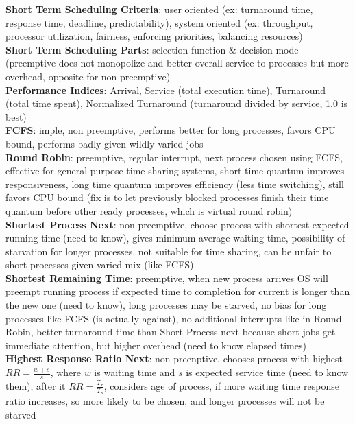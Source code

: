 \documentclass[a4paper]{article}
\begin{document}
\begin{multicols}{2}
        \textbf{Short Term Scheduling Criteria}: user oriented (ex: turnaround time, response time, deadline, predictability), system oriented (ex: throughput, processor utilization, fairness, enforcing priorities, balancing resources)\\
        \textbf{Short Term Scheduling Parts}: selection function \& decision mode (preemptive does not monopolize and better overall service to processes but more overhead, opposite for non preemptive)\\
        \textbf{Performance Indices}: Arrival, Service (total execution time), Turnaround (total time spent), Normalized Turnaround (turnaround divided by service, 1.0 is best)\\
        \textbf{FCFS}: imple, non preemptive, performs better for long processes, favors CPU bound, performs badly given wildly varied jobs\\
        \textbf{Round Robin}: preemptive, regular interrupt, next process chosen using FCFS, effective for general purpose time sharing systems, short time quantum improves responsiveness, long time quantum improves efficiency (less time switching), still favors CPU bound (fix is to let previously blocked processes finish their time quantum before other ready processes, which is virtual round robin)\\
        \textbf{Shortest Process Next}: non preemptive, choose process with shortest expected running time (need to know), gives minimum average waiting time, possibility of starvation for longer processes, not suitable for time sharing, can be unfair to short processes given varied mix (like FCFS)\\
        \textbf{Shortest Remaining Time}: preemptive, when new process arrives OS will preempt running process if expected time to completion for current is longer than the new one (need to know), long processes may be starved, no bias for long processes like FCFS (is actually against), no additional interrupts like in Round Robin, better turnaround time than Short Process next because short jobs get immediate attention, but higher overhead (need to know elapsed times)\\
        \textbf{Highest Response Ratio Next}: non preenptive, chooses process with highest $RR = \frac{w+s}{s}$, where $w$ is waiting time and $s$ is expected service time (need to know them), after it $RR = \frac{T_r}{T_s}$, considers age of process, if more waiting time response ratio increases, so more likely to be chosen, and longer processes will not be starved\\

\end{multicols}
\end{document}
